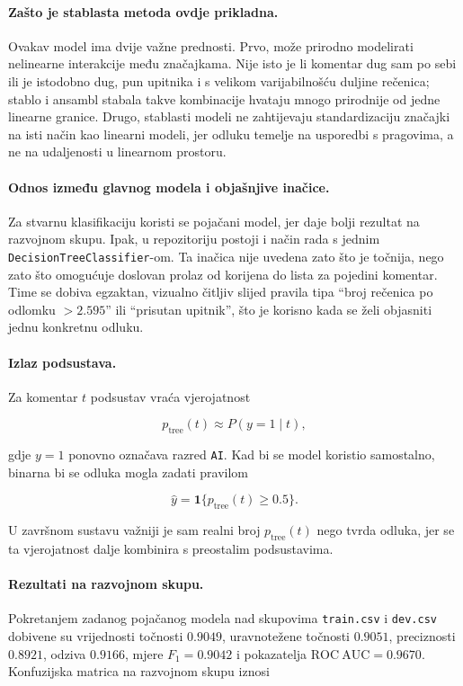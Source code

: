 \paragraph{Zašto je stablasta metoda ovdje prikladna.}
Ovakav model ima dvije važne prednosti. Prvo, može prirodno modelirati nelinearne interakcije među značajkama. Nije isto je li komentar dug sam po sebi ili je istodobno dug, pun upitnika i s velikom varijabilnošću duljine rečenica; stablo i ansambl stabala takve kombinacije hvataju mnogo prirodnije od jedne linearne granice. Drugo, stablasti modeli ne zahtijevaju standardizaciju značajki na isti način kao linearni modeli, jer odluku temelje na usporedbi s pragovima, a ne na udaljenosti u linearnom prostoru.

\paragraph{Odnos između glavnog modela i objašnjive inačice.}
Za stvarnu klasifikaciju koristi se pojačani model, jer daje bolji rezultat na razvojnom skupu. Ipak, u repozitoriju postoji i način rada s jednim \texttt{DecisionTreeClassifier}-om. Ta inačica nije uvedena zato što je točnija, nego zato što omogućuje doslovan prolaz od korijena do lista za pojedini komentar. Time se dobiva egzaktan, vizualno čitljiv slijed pravila tipa ``broj rečenica po odlomku $> 2.595$'' ili ``prisutan upitnik'', što je korisno kada se želi objasniti jednu konkretnu odluku.

\paragraph{Izlaz podsustava.}
Za komentar $t$ podsustav vraća vjerojatnost

\[
p_{\mathrm{tree}}(t) \approx P(y=1\mid t),
\]

gdje $y=1$ ponovno označava razred \texttt{AI}. Kad bi se model koristio samostalno, binarna bi se odluka mogla zadati pravilom

\[
\hat y = \mathbf{1}\{p_{\mathrm{tree}}(t)\ge 0.5\}.
\]

U završnom sustavu važniji je sam realni broj $p_{\mathrm{tree}}(t)$ nego tvrda odluka, jer se ta vjerojatnost dalje kombinira s preostalim podsustavima.

\paragraph{Rezultati na razvojnom skupu.}
Pokretanjem zadanog pojačanog modela nad skupovima \texttt{train.csv} i \texttt{dev.csv} dobivene su vrijednosti točnosti $0.9049$, uravnotežene točnosti $0.9051$, preciznosti $0.8921$, odziva $0.9166$, mjere $F_1=0.9042$ i pokazatelja $\mathrm{ROC\ AUC}=0.9670$. Konfuzijska matrica na razvojnom skupu iznosi

